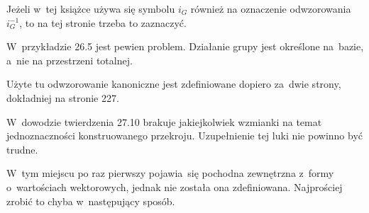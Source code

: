 \documentclass[a4paper,11pt]{article}
\numberwithin{equation}{section}
\begin{document}
\noindent
{} Jeżeli w~tej książce używa się symbolu $i_{ G }$
również na oznaczenie odwzorowania $i_{ G }^{ -1 }$, to na tej stronie
trzeba to zaznaczyć.

\vspace{\spaceFour}



\noindent
{} W~przykładzie 26.5 jest pewien problem. Działanie
grupy jest określone na~bazie, a~nie na przestrzeni totalnej.

\vspace{\spaceFour}





\noindent
{} Użyte tu odwzorowanie kanoniczne jest zdefiniowane
dopiero za~dwie strony, dokładniej na stronie 227.

\vspace{\spaceFour}





\noindent
{} W~dowodzie twierdzenia 27.10 brakuje jakiejkolwiek
wzmianki na temat jednoznaczności konstruowanego przekroju.
Uzupełnienie tej luki nie powinno być trudne.

\vspace{\spaceFour}





\noindent
{} W~tym miejscu po raz pierwszy pojawia~się pochodna
zewnętrzna z~formy o~wartościach wektorowych, jednak nie została ona
zdefiniowana. Najprościej zrobić to chyba w~następujący sposób.





\newpage

\end{document}
